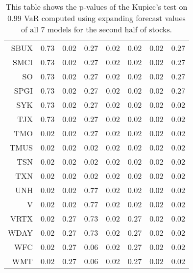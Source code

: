 \begin{table}[ht]
\begin{tabular}{rrrrrrrr}
  SBUX & 0.73 & 0.02 & 0.27 & 0.02 & 0.02 & 0.02 & 0.27 \\ 
  SMCI & 0.73 & 0.02 & 0.27 & 0.02 & 0.02 & 0.02 & 0.27 \\ 
  SO & 0.73 & 0.02 & 0.27 & 0.02 & 0.02 & 0.02 & 0.27 \\ 
  SPGI & 0.73 & 0.02 & 0.27 & 0.02 & 0.02 & 0.02 & 0.27 \\ 
  SYK & 0.73 & 0.02 & 0.27 & 0.02 & 0.02 & 0.02 & 0.02 \\ 
  TJX & 0.73 & 0.02 & 0.27 & 0.02 & 0.02 & 0.02 & 0.02 \\ 
  TMO & 0.02 & 0.02 & 0.27 & 0.02 & 0.02 & 0.02 & 0.02 \\ 
  TMUS & 0.02 & 0.02 & 0.02 & 0.02 & 0.02 & 0.02 & 0.02 \\ 
  TSN & 0.02 & 0.02 & 0.02 & 0.02 & 0.02 & 0.02 & 0.02 \\ 
  TXN & 0.02 & 0.02 & 0.02 & 0.02 & 0.02 & 0.02 & 0.02 \\ 
  UNH & 0.02 & 0.02 & 0.77 & 0.02 & 0.02 & 0.02 & 0.02 \\ 
  V & 0.02 & 0.02 & 0.77 & 0.02 & 0.02 & 0.02 & 0.02 \\ 
  VRTX & 0.02 & 0.27 & 0.73 & 0.02 & 0.27 & 0.02 & 0.02 \\ 
  WDAY & 0.02 & 0.27 & 0.73 & 0.02 & 0.27 & 0.02 & 0.02 \\ 
  WFC & 0.02 & 0.27 & 0.06 & 0.02 & 0.27 & 0.02 & 0.02 \\ 
  WMT & 0.02 & 0.27 & 0.06 & 0.02 & 0.27 & 0.02 & 0.02 \\ 
   \hline
\end{tabular}
\caption[Kupiec's test p-values, alpha =0.99 (2)]{This table shows the p-values of the Kupiec's test on 0.99 VaR computed using expanding forecast values of all 7 models for the second half of stocks.} 
\label{Table:Kupiec_test_expanding_0.99_2}
\end{table}
